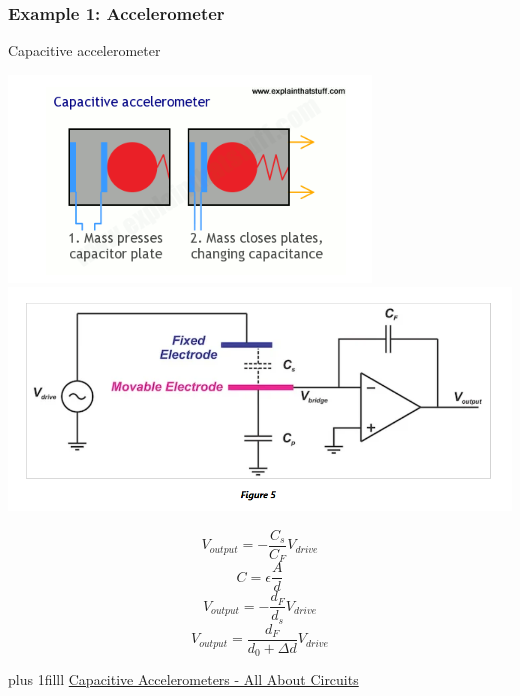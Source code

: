 \documentclass[fleqn]{beamer} %
\newcommand{\sectionIIsubsectionIIItitle}{Example 1: Accelerometer}
\newcommand{\btVFill}{\vskip0pt plus 1filll}
\begin{document}
			\begin{frame}
			\frametitle{\sectionIIsubsectionIIItitle}
			\scriptsize
				Capacitive accelerometer                                  
 
			 	\includegraphics[scale=.45]{images/Capacitance.png}
			 	\includegraphics[scale=.30]{images/singleended_cap_accel.png}

				\[V_{output}=-\frac{C_s}{C_F}V_{drive}\]
				\[C=\epsilon\frac{A}{d}\]
				\[V_{output}=-\frac{d_F}{d_s}V_{drive}\]			 	
				\[V_{output}=\frac{d_F}{d_0+\Delta d}V_{drive}\]


			    \btVFill
			    {\tiny \href{https://www.allaboutcircuits.com/technical-articles/introduction-to-capacitive-accelerometer-measure-acceleration-capacitive-sensing/}{Capacitive Accelerometers - All About Circuits} }

			\end{frame}
\end{document}
